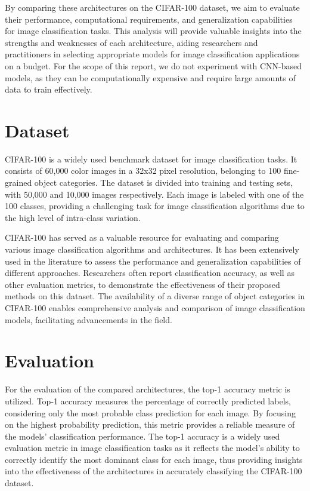 \documentclass{article}
\begin{document}
By comparing these architectures on the CIFAR-100 dataset, we aim to evaluate their performance, computational requirements, and generalization capabilities for image classification tasks. 
This analysis will provide valuable insights into the strengths and weaknesses of each architecture, aiding researchers and practitioners in selecting appropriate models for image classification applications on a budget.
For the scope of this report, we do not experiment with CNN-based models, as they can be computationally expensive and require large amounts of data to train effectively.

\section{Dataset}
CIFAR-100 is a widely used benchmark dataset for image classification tasks. 
It consists of 60,000 color images in a 32x32 pixel resolution, belonging to 100 fine-grained object categories. 
The dataset is divided into training and testing sets, with 50,000 and 10,000 images respectively. 
Each image is labeled with one of the 100 classes, providing a challenging task for image classification algorithms due to the high level of intra-class variation.

CIFAR-100 has served as a valuable resource for evaluating and comparing various image classification algorithms and architectures. 
It has been extensively used in the literature to assess the performance and generalization capabilities of different approaches. 
Researchers often report classification accuracy, as well as other evaluation metrics, to demonstrate the effectiveness of their proposed methods on this dataset. 
The availability of a diverse range of object categories in CIFAR-100 enables comprehensive analysis and comparison of image classification models, facilitating advancements in the field.


\section{Evaluation}
For the evaluation of the compared architectures, the top-1 accuracy metric is utilized. 
Top-1 accuracy measures the percentage of correctly predicted labels, considering only the most probable class prediction for each image. By focusing on the highest probability prediction, this metric provides a reliable measure of the models' classification performance. 
The top-1 accuracy is a widely used evaluation metric in image classification tasks as it reflects the model's ability to correctly identify the most dominant class for each image, thus providing insights into the effectiveness of the architectures in accurately classifying the CIFAR-100 dataset.
\end{document}

